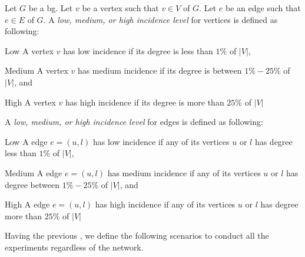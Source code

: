 \begin{definition}\label{def:exp:incidence}
Let $G$ be a \acrlong{bg}.
Let $v$ be a vertex such that $v \in V$ of $G$.
Let $e$ be an edge such that $e \in E$ of $G$.
A \emph{low, medium, or high incidence level} for vertices is defined as following:
\begin{inparaenum}
  \item[Low] A vertex $v$ has low incidence if its degree is less than $1\%$ of $|V|$,
  \item[Medium] A vertex $v$ has medium incidence if its degree is between $1\%-25\%$ of $|V|$, and
  \item[High] A vertex $v$ has high incidence if its degree is more than $25\%$ of $|V|$
\end{inparaenum}
A \emph{low, medium, or high incidence level} for edges is defined as following:
\begin{inparaenum}
  \item[Low] A edge $e = (u, l)$ has low incidence if any of its vertices $u$ or $l$ has degree less than $1\%$ of $|V|$,
  \item[Medium] A edge $e = (u, l)$ has medium incidence if any of its vertices $u$ or $l$ has degree between $1\%-25\%$ of $|V|$, and
  \item[High] A edge $e = (u, l)$ has high incidence if any of its vertices $u$ or $l$ has degree more than $25\%$ of $|V|$
\end{inparaenum}
\end{definition}


Having the previous , we define the following scenarios to conduct all the experiments regardless of the network.

